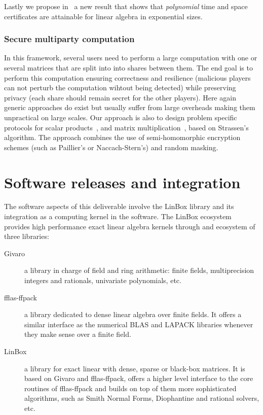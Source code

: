 \documentclass{deliverablereport}
\begin{document}
Lastly we propose in~\cite{DKVZ17} a new result that shows that 
{\em polynomial} time and space certificates are attainable for linear
algebra in exponential sizes. 

\subsubsection{Secure multiparty computation}

In this framework, several users need to perform a large computation with one or several
matrices that are split into into shares between them. The end goal is to
perform this computation ensuring correctness and resilience (malicious players
can not perturb the computation wihtout being detected) while preserving privacy (each
share should remain secret for the other players).
Here again generic approaches do exist but usually suffer from large overheads
making them 
unpractical on large scales.
Our approach is also to design problem specific protocols for scalar
products~\cite{DLOP17}, and matrix multiplication~\cite{DFLLOPP18}, based on
Strassen's algorithm. The approach combines the use of semi-homomorphic
encryption schemes (such as Paillier's or Naccach-Stern's) and random masking.

\section{Software releases and integration}

The software aspects of this deliverable involve the LinBox library
and its integration as a computing kernel in the \Sage software.
The LinBox ecosystem provides high performance exact linear algebra kernels
through and ecosystem of three libraries:
\begin{description}
  \item[Givaro] a library in charge of field and ring arithmetic: finite
    fields, multiprecision integers and rationals, univariate polynomials, etc.
  \item[fflas-ffpack] a library dedicated to dense linear algebra over finite
    fields. It offers a similar interface as the numerical BLAS and LAPACK
    libraries whenever they make sense over a finite field.
  \item[LinBox] a library for exact linear with dense, sparse or black-box
    matrices. It is based on Givaro and fflas-ffpack, offers a higher level interface
    to the core routines of fflas-ffpack and builds on top of them more
    sophisticated algorithms, such as Smith Normal Forms, Diophantine and
    rational solvers, etc.
  \end{description}
\end{document}

